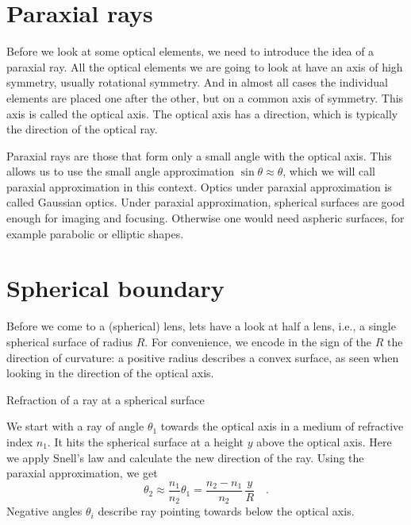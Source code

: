 \section{Paraxial rays}

Before we look at some optical elements, we need to introduce the idea of a paraxial ray. All the optical elements we are going to look at have an axis of high symmetry, usually rotational symmetry. And in almost all cases the individual elements are placed one after the other, but on a common axis of symmetry. This axis is called the optical axis. The optical axis has a direction, which is typically the direction of the optical ray.

Paraxial rays are those that form only a small angle with the optical axis. This allows us to use the small angle approximation $\sin \theta \approx \theta$, which we will call paraxial approximation in this context. Optics under paraxial approximation is called Gaussian optics. Under paraxial approximation, spherical surfaces are good enough for imaging and focusing. Otherwise one would need aspheric surfaces, for example parabolic or elliptic shapes.


\section{Spherical boundary}

Before we come to a (spherical) lens, lets have a look at half a lens, i.e., a single spherical surface of radius $R$. For convenience, we encode in the sign of the $R$ the direction of curvature: a positive radius describes a convex surface, as seen when looking in the direction of the optical axis.

\begin{marginfigure}
   \caption{Refraction of  a ray at a spherical surface}
\end{marginfigure}

We start with a ray of angle $\theta_1$ towards the optical axis in a medium of refractive index $n_1$. It hits the spherical surface at a height $y$ above the optical axis. Here we apply Snell's law and calculate the new direction of the ray. Using the paraxial approximation, we get
\begin{equation}
    \theta_2 \approx \frac{n_1}{n_2} \theta_1 =  \frac{n_2 - n_1}{n_2} \, \frac{y}{R} \quad .
    \label{eq:1_single_spherical_surface}
\end{equation}
Negative angles $\theta_i$ describe ray pointing towards below the optical axis.


